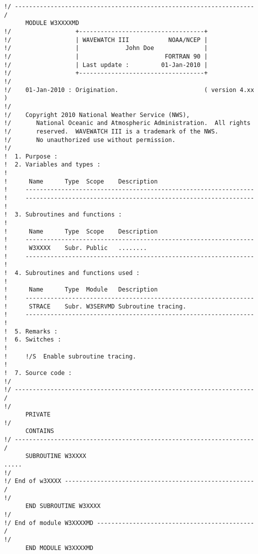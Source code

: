 {\scriptsize \begin{verbatim}
!/ ------------------------------------------------------------------- /
      MODULE W3XXXXMD
!/                  +-----------------------------------+
!/                  | WAVEWATCH III           NOAA/NCEP |
!/                  |             John Doe              |
!/                  |                        FORTRAN 90 |
!/                  | Last update :         01-Jan-2010 |
!/                  +-----------------------------------+
!/
!/    01-Jan-2010 : Origination.                        ( version 4.xx )
!/
!/    Copyright 2010 National Weather Service (NWS),
!/       National Oceanic and Atmospheric Administration.  All rights
!/       reserved.  WAVEWATCH III is a trademark of the NWS. 
!/       No unauthorized use without permission.
!/
!  1. Purpose :
!  2. Variables and types :
!
!      Name      Type  Scope    Description
!     ----------------------------------------------------------------
!     ----------------------------------------------------------------
!
!  3. Subroutines and functions :
!
!      Name      Type  Scope    Description
!     ----------------------------------------------------------------
!      W3XXXX    Subr. Public   ........
!     ----------------------------------------------------------------
!
!  4. Subroutines and functions used :
!
!      Name      Type  Module   Description
!     ----------------------------------------------------------------
!      STRACE    Subr. W3SERVMD Subroutine tracing.
!     ----------------------------------------------------------------
!
!  5. Remarks :
!  6. Switches :
!
!     !/S  Enable subroutine tracing.
!
!  7. Source code :
!/
!/ ------------------------------------------------------------------- /
!/
      PRIVATE
!/
      CONTAINS
!/ ------------------------------------------------------------------- /
      SUBROUTINE W3XXXX
.....
!/
!/ End of w3XXXX ----------------------------------------------------- /
!/
      END SUBROUTINE W3XXXX
!/
!/ End of module W3XXXXMD -------------------------------------------- /
!/
      END MODULE W3XXXXMD
\end{verbatim}}
